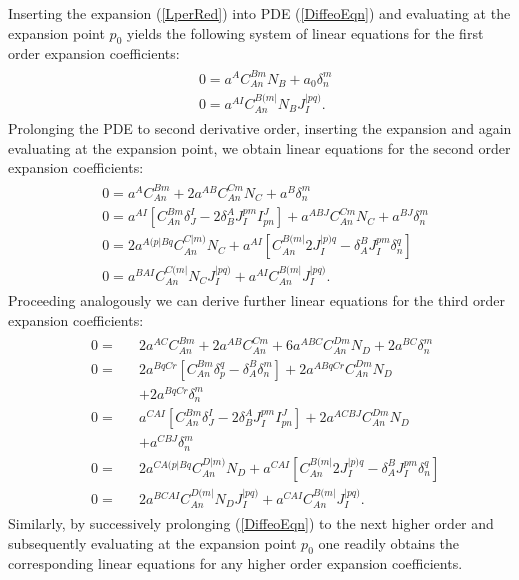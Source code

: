 \documentclass[%
 reprint,
nofootinbib,
 amsmath,amssymb,
 aps,
 prd,
floatfix,
]{revtex4-2}
\begin{document}
Inserting the expansion (\ref{LperRed}) into PDE (\ref{DiffeoEqn}) and evaluating at the expansion point $p_0$ yields the following system of linear equations for the first order expansion coefficients:
\begin{align}\label{order1}
    \begin{aligned}
    &0 = a^A C_{An}^{Bm}N_B + a_0 \delta^m_n\\
    &0 = a^{AI}C_{An}^{B(m\vert }N_B J^{\vert pq)}_I.
    \end{aligned}
\end{align}
Prolonging the PDE to second derivative order, inserting the expansion and again evaluating at the expansion point, we obtain linear equations for the second order expansion coefficients: 
\begin{align}\label{order2}
    \begin{aligned}
    &0 = a^A C_{An}^{Bm} + 2 a^{AB}C_{An}^{Cm}N_C + a^B\delta^m_n\\
    &0 = a^{AI}\left [C_{An}^{Bm}\delta^I _J- 2 \delta^A_B J_I^{pm}I^J_{pn} \right ] + a^{ABJ}C_{An}^{Cm}N_C + a^{BJ} \delta^m_n \\
    &0 = 2a^{A(p\vert Bq}C_{An}^{C\vert m)}N_C + a^{AI} \left [C_{An}^{B(m\vert} 2 J_{I}^{\vert p)q} - \delta_A^BJ_I^{pm}\delta^q_n \right ]\\
    &0 = a^{BAI}C_{An}^{C(m\vert}N_CJ_I^{\vert pq)} + a^{AI}C_{An}^{B(m \vert} J_I^{\vert pq)}.
    \end{aligned}
\end{align}
Proceeding analogously we can derive further linear equations for the third order expansion coefficients:
\begin{align}\label{order3}
\begin{aligned}
&0 = &&2 a^{AC}C_{An}^{Bm} + 2a^{AB}C_{An}^{Cm} + 6 a^{ABC}C_{An}^{Dm} N_D + 2a^{BC} \delta^m_n\\
&0 = &&2 a^{BqCr} \left [ C_{An}^{Bm} \delta ^q_p - \delta^B_A \delta^m_n \right ] +2 a^{A Bq Cr} C_{An}^{Dm} N_D\\
& &&+ 2 a^{BqCr} \delta^m_n\\
&0 = &&a^{CAI} \left [C_{An}^{Bm}\delta^I _J- 2 \delta^A_B J_I^{pm}I^J_{pn} \right ] + 2 a^{ACBJ} C_{An}^{Dm} N_D\\
& &&+ a^{CBJ} \delta ^m _n \\
&0 = &&2 a^{C A(p \vert B q} C_{An}^{D \vert m )} N_D + a^{CAI} \left [C_{An}^{B(m\vert} 2 J_{I}^{\vert p)q} - \delta_A^BJ_I^{pm}\delta^q_n \right ]\\
&0 = &&2 a^{BCAI}C_{An}^{D(m\vert}N_DJ_I^{\vert pq)} + a^{CAI}C_{An}^{B(m \vert} J_I^{\vert pq)}.
\end{aligned}
\end{align}
Similarly, by successively prolonging (\ref{DiffeoEqn}) to the next higher order and subsequently evaluating at the expansion point $p_0$ one readily obtains the corresponding linear equations for any higher order expansion coefficients. 
\end{document}
